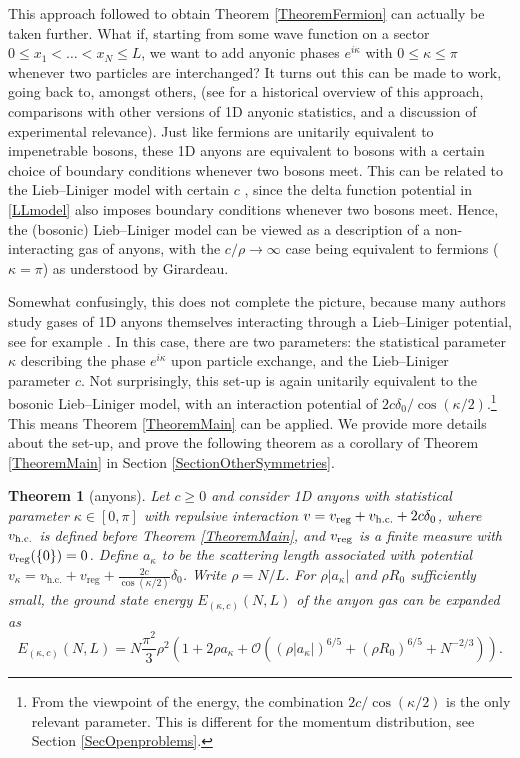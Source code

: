 \documentclass[a4paper,11pt]{article}
\newtheorem{theorem}{Theorem}
\numberwithin{equation}{section}
\begin{document}
This approach followed to obtain Theorem \ref{TheoremFermion} can actually be taken further. What if, starting from some wave function on a sector $0\leq x_1<\dots<x_N\leq L$, we want to add anyonic phases $e^{i\kappa}$ with $0\leq \kappa\leq\pi$ whenever two particles are interchanged? It turns out this can be made to work, going back to, amongst others,  \cite{leinaas1977theory,kundu1999exact} (see \cite{posske2017second,bonkhoff2021bosonic} for a historical overview of this approach, comparisons with other versions of 1D anyonic statistics, and a discussion of experimental relevance). Just like fermions are unitarily equivalent to impenetrable bosons, these 1D anyons are equivalent to bosons with a certain choice of boundary conditions whenever two bosons meet. This can be related to the Lieb--Liniger model with certain $c$ \cite{posske2017second}, since the delta function potential in \eqref{LLmodel} also imposes boundary conditions whenever two bosons meet. Hence, the (bosonic) Lieb--Liniger model can be viewed as a description of a non-interacting gas of anyons, with the $c/\rho\to\infty$ case being equivalent to fermions ($\kappa=\pi$) as understood by Girardeau. 

Somewhat confusingly, this does not complete the picture, because many authors study gases of 1D anyons themselves interacting through a Lieb--Liniger potential, see for example \cite{batchelor2006one,hao2008ground}. In this case, there are two parameters: the statistical parameter $\kappa$ describing the phase $e^{i\kappa}$ upon particle exchange, and the Lieb--Liniger parameter $c$. Not surprisingly, this set-up is again unitarily equivalent to the bosonic Lieb--Liniger model, with an interaction potential of $2c\delta_0/\cos(\kappa/2)$.\footnote{From the viewpoint of the energy, the combination $2c/\cos(\kappa/2)$ is the only relevant parameter. This is different for the momentum distribution, see Section \ref{SecOpenproblems}.} This means Theorem \ref{TheoremMain} can be applied. We provide more details about the set-up, and prove the following theorem as a corollary of Theorem \ref{TheoremMain} in Section \ref{SectionOtherSymmetries}.



\begin{theorem}[anyons]
\label{TheoremAnyon}
Let $c\geq0$ and consider 1D anyons with statistical parameter $\kappa\in[0,\pi]$ with repulsive interaction $v=v_{\textnormal{reg}}+v_{\textnormal{h.c.}}+2c\delta_0$, where $v_{\textnormal{h.c.}}$ is defined before Theorem \ref{TheoremMain}, and $v_{\textnormal{reg}}$ is a finite measure with $v_{\textnormal{reg}}(\{0\})=0$.
Define $a_\kappa$ to be the scattering length associated with potential $ v_\kappa=v_{\text{h.c.}}+v_{\text{reg}}+\frac{2c}{\cos(\kappa/2)}\delta_0 $.
Write $\rho=N/L$. For $\rho|a_\kappa|$ and $\rho R_0$ sufficiently small, the ground state energy $E_{(\kappa,c)}(N,L)$ of the anyon gas can be expanded as
\begin{equation}
E_{(\kappa,c)}(N,L)=N\frac{\pi^2}{3}\rho^2\left(1+2\rho a_{\kappa}+\mathcal{O}
\left((\rho|a_\kappa|)^{6/5}+(\rho R_0)^{6/5}+N^{-2/3}\right)\right).
\end{equation}
\end{theorem}
\end{document}
